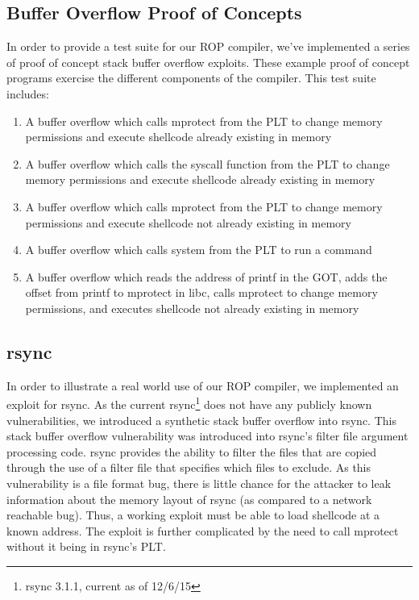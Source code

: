 \documentclass[journal]{IEEEtran}
\begin{document}
\subsection{Buffer Overflow Proof of Concepts}
In order to provide a test suite for our ROP compiler, we've implemented a series of proof of concept stack buffer overflow exploits.
These example proof of concept programs exercise the different components of the compiler.
This test suite includes:
\begin{enumerate}
  \item A buffer overflow which calls mprotect from the PLT to change memory permissions and execute shellcode already existing in memory
  \item A buffer overflow which calls the syscall function from the PLT to change memory permissions and execute shellcode already existing in memory
  \item A buffer overflow which calls mprotect from the PLT to change memory permissions and execute shellcode not already existing in memory
  \item A buffer overflow which calls system from the PLT to run a command
  \item A buffer overflow which reads the address of printf in the GOT, adds the offset from printf to mprotect in libc, calls
  mprotect to change memory permissions, and executes shellcode not already existing in memory
\end{enumerate}

\subsection{rsync}
In order to illustrate a real world use of our ROP compiler, we implemented an exploit for rsync.
As the current rsync\footnote{rsync 3.1.1, current as of 12/6/15} does not have any publicly known vulnerabilities, we introduced a synthetic stack buffer overflow into rsync.
This stack buffer overflow vulnerability was introduced into rsync's filter file argument processing code.
rsync provides the ability to filter the files that are copied through the use of a filter file that specifies which files to exclude.
As this vulnerability is a file format bug, there is little chance for the attacker to leak information about the memory layout of rsync (as compared to a network reachable bug).
Thus, a working exploit must be able to load shellcode at a known address.
The exploit is further complicated by the need to call mprotect without it being in rsync's PLT.
\end{document}
